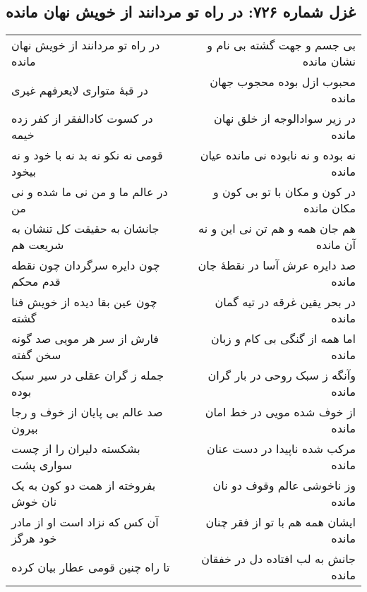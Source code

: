 \begin{center}
\section*{غزل شماره ۷۲۶: در راه تو مردانند از خویش نهان مانده}
\label{sec:726}
\begin{longtable}{l p{0.5cm} r}
در راه تو مردانند از خویش نهان مانده
&&
بی جسم و جهت گشته بی نام و نشان مانده
\\
در قبهٔ متواری لایعرفهم غیری
&&
محبوب ازل بوده محجوب جهان مانده
\\
در کسوت کادالفقر از کفر زده خیمه
&&
در زیر سوادالوجه از خلق نهان مانده
\\
قومی نه نکو نه بد نه با خود و نه بیخود
&&
نه بوده و نه نابوده نی مانده عیان مانده
\\
در عالم ما و من نی ما شده و نی من
&&
در کون و مکان با تو بی کون و مکان مانده
\\
جانشان به حقیقت کل تنشان به شریعت هم
&&
هم جان همه و هم تن نی این و نه آن مانده
\\
چون دایره سرگردان چون نقطه قدم محکم
&&
صد دایره عرش آسا در نقطهٔ جان مانده
\\
چون عین بقا دیده از خویش فنا گشته
&&
در بحر یقین غرقه در تیه گمان مانده
\\
فارش از سر هر مویی صد گونه سخن گفته
&&
اما همه از گنگی بی کام و زبان مانده
\\
جمله ز گران عقلی در سیر سبک بوده
&&
وآنگه ز سبک روحی در بار گران مانده
\\
صد عالم بی پایان از خوف و رجا بیرون
&&
از خوف شده مویی در خط امان مانده
\\
بشکسته دلیران را از چست سواری پشت
&&
مرکب شده ناپیدا در دست عنان مانده
\\
بفروخته از همت دو کون به یک نان خوش
&&
وز ناخوشی عالم وقوف دو نان مانده
\\
آن کس که نزاد است او از مادر خود هرگز
&&
ایشان همه هم با تو از فقر چنان مانده
\\
تا راه چنین قومی عطار بیان کرده
&&
جانش به لب افتاده دل در خفقان مانده
\\
\end{longtable}
\end{center}
